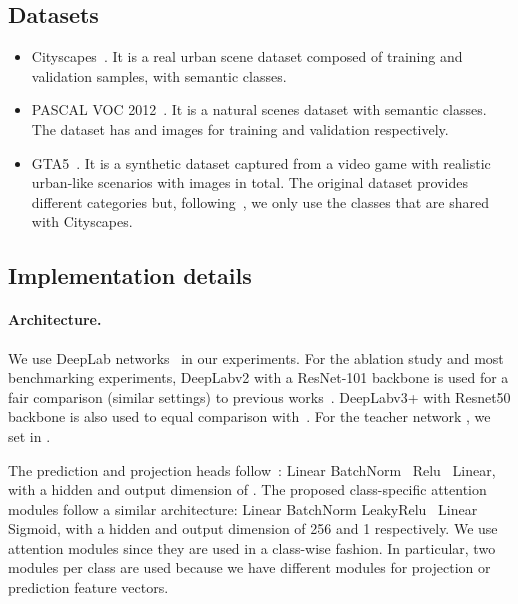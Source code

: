 \documentclass[10pt,twocolumn,letterpaper]{article}
\begin{document}
\subsection{Datasets}
\begin{itemize}
    \item Cityscapes~\cite{cordts2016cityscapes}. It is a real urban scene dataset composed of  training and  validation samples, with  semantic classes. \item PASCAL VOC 2012~\cite{everingham2010pascal}. It is a natural scenes dataset with  semantic classes. The dataset has  and  images for training and validation respectively.
    
    \item GTA5~\cite{richter2016playing}. It is a synthetic dataset captured from a video game with realistic urban-like scenarios with  images in total. The original dataset provides  different categories but, following~\cite{wang2020alleviating}, we only use the  classes that are shared with Cityscapes.
\end{itemize}
 



\subsection{Implementation details}
\label{sec:implementation}
\paragraph{Architecture.} We use DeepLab networks~\cite{chen2017deeplab} in our experiments. For the ablation study and most benchmarking experiments, DeepLabv2 with a ResNet-101 backbone is used for a fair comparison (\ie similar settings) to previous works~\cite{olsson2021classmix, feng2020semiCBC, hung2018adversarial, mittal2019semi}. DeepLabv3+ with Resnet50 backbone is also used to equal comparison with~\cite{mendel2020semi}. For the teacher network , we set  in .

The prediction and projection heads follow~\cite{grill2020bootstrap}: Linear  BatchNorm~\cite{ioffe2015batch}  Relu~\cite{nair2010rectified}  Linear, with a hidden and output dimension of .
The proposed class-specific attention modules follow a similar architecture: Linear  BatchNorm  LeakyRelu~\cite{maas2013rectifier}  Linear  Sigmoid, with a hidden and output dimension of 256 and 1 respectively. We use  attention modules since they are used in a class-wise fashion. In particular, two modules per class are used because we have different modules for projection or prediction feature vectors.
\end{document}
